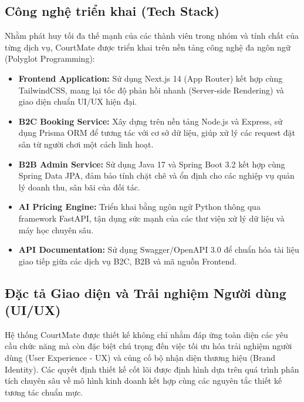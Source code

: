 \subsection{Công nghệ triển khai (Tech Stack)}
Nhằm phát huy tối đa thế mạnh của các thành viên trong nhóm và tính chất của từng dịch vụ, CourtMate được triển khai trên nền tảng công nghệ đa ngôn ngữ (Polyglot Programming):

\begin{itemize}
    \item \textbf{Frontend Application:} Sử dụng Next.js 14 (App Router) kết hợp cùng TailwindCSS, mang lại tốc độ phản hồi nhanh (Server-side Rendering) và giao diện chuẩn UI/UX hiện đại.    \item \textbf{B2C Booking Service:} Xây dựng trên nền tảng Node.js và Express, sử dụng Prisma ORM để tương tác với cơ sở dữ liệu, giúp xử lý các request đặt sân từ người chơi một cách linh hoạt.    \item \textbf{B2B Admin Service:} Sử dụng Java 17 và Spring Boot 3.2 kết hợp cùng Spring Data JPA, đảm bảo tính chặt chẽ và ổn định cho các nghiệp vụ quản lý doanh thu, sân bãi của đối tác.    \item \textbf{AI Pricing Engine:} Triển khai bằng ngôn ngữ Python thông qua framework FastAPI, tận dụng sức mạnh của các thư viện xử lý dữ liệu và máy học chuyên sâu.    \item \textbf{API Documentation:} Sử dụng Swagger/OpenAPI 3.0 để chuẩn hóa tài liệu giao tiếp giữa các dịch vụ B2C, B2B và mã nguồn Frontend.\end{itemize}

\subsection{Đặc tả Giao diện và Trải nghiệm Người dùng (UI/UX)}

Hệ thống CourtMate được thiết kế không chỉ nhằm đáp ứng toàn diện các yêu cầu chức năng mà còn đặc biệt chú trọng đến việc tối ưu hóa trải nghiệm người dùng (User Experience - UX) và củng cố bộ nhận diện thương hiệu (Brand Identity). Các quyết định thiết kế cốt lõi được định hình dựa trên quá trình phân tích chuyên sâu về mô hình kinh doanh kết hợp cùng các nguyên tắc thiết kế tương tác chuẩn mực.

